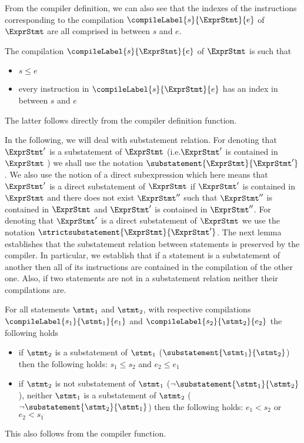 From the compiler definition, we can also see that the indexes of the instructions corresponding to the compilation 
$\compileLabel{s}{\ExprStmt}{e}$  of $ \ExprStmt$  are all comprised in between $s$ and $e$.  
\begin{compPropApp}\label{compile:prop:compPropIndex}
The compilation $\compileLabel{s}{\ExprStmt}{e}$ 
of $ \ExprStmt$ is such that 

\begin{itemize}
 \item $s \le e$
 \item every instruction in $\compileLabel{s}{\ExprStmt}{e}$  has an index  in between $s$ and $e$
\end{itemize}
\end{compPropApp}
The latter follows directly from the compiler definition function.
 
In the following,  we will deal with substatement relation. For denoting that  $\ExprStmt'$ is a substatement of  $\ExprStmt$ (i.e.$\ExprStmt'$ is contained in  $\ExprStmt$  )
we shall use the notation $\substatement{\ExprStmt }{\ExprStmt'}$. 
We also use the notion of a direct subexpression which here means that  $\ExprStmt'$ is a direct substatement of  $\ExprStmt$
if $\ExprStmt'$  is contained in $\ExprStmt$ 
and there does not exist  $\ExprStmt''$  such that  $\ExprStmt''$ is contained in   $\ExprStmt$ and  $\ExprStmt'$ is contained in  $\ExprStmt''$.
For denoting that  $\ExprStmt'$ is a direct substatement of  $\ExprStmt$
we use the notation $\strictsubstatement{\ExprStmt }{\ExprStmt'}$.
The next lemma establishes that the substatement relation between statements is preserved by the compiler. 
In particular, we establish that if a statement is a substatement of another then all of its instructions are contained in 
the compilation of the other one. Also, if two statements are not in a substatement relation neither their compilations are.
\begin{compPropApp}\label{compile:prop:compProp6}
   For all statements $\stmt_1$ and $\stmt_2$, with respective compilations 
   $\compileLabel{s_1}{\stmt_1}{e_1}$ and  $\compileLabel{s_2}{\stmt_2}{e_2}$ the following holds
   \begin{itemize} 
         \item if $\stmt_2$ is a substatement of  $\stmt_1$ ($\substatement{\stmt_1}{\stmt_2}$) then the following holds:
	     $s_1 \le s_2$ and $ e_2 \le e_1$
	  \item if  $\stmt_2$ is not  substatement of  $\stmt_1$ ($\neg \substatement{\stmt_1}{\stmt_2}$), neither $\stmt_1$ is a substatement of  $\stmt_2$ 
                ($\neg \substatement{\stmt_2}{\stmt_1}$) then the following holds:
	     $e_1 < s_2  $ or $ e_2 < s_1$
   \end{itemize}
\end{compPropApp}
This also follows from the compiler function.


